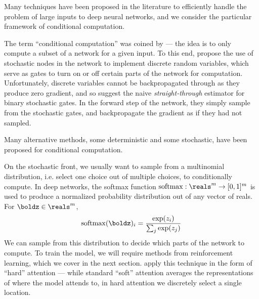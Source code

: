 \documentclass[12pt]{report}
\begin{document}
Many techniques have been proposed in the literature to efficiently handle the problem of large inputs to deep neural networks, and we consider the particular framework of conditional computation.

The term ``conditional computation'' was coined by \citet{BengioLC13} --- the idea is to only compute a subset of a network for a given input. 
To this end, \citet{BengioLC13} propose the use of stochastic nodes in the network to implement discrete random variables, which serve as gates to turn on or off certain parts of the network for computation.
Unfortunately, discrete variables cannot be backpropagated through as they produce zero gradient, and so \citet{BengioLC13} suggest the naive \emph{straight-through} estimator for binary stochastic gates.
In the forward step of the network, they simply sample from the stochastic gates, and backpropagate the gradient as if they had not sampled.

Many alternative methods, some deterministic and some stochastic, have been proposed for conditional computation. 

On the stochastic front, we usually want to sample from a multinomial distribution, i.e. select one choice out of multiple choices, to conditionally compute. In deep networks, the softmax function $\operatorname{softmax} : \reals^m \to [0,1]^m$ is used to produce a normalized probability distribution out of any vector of reals. For $\boldz \in \reals^m$,
\begin{equation}
\operatorname{softmax}(\boldz)_i = \frac{\exp(z_i)}{\sum_j \exp(z_j)}
\end{equation}
We can sample from this distribution to decide which parts of the network to compute. To train the model, we will require methods from reinforcement learning, which we cover in the next section. \citet{xu2015captioning} apply this technique in the form of ``hard'' attention --- while standard ``soft'' attention averages the representations of where the model attends to, in hard attention we discretely select a single location.
\end{document}
